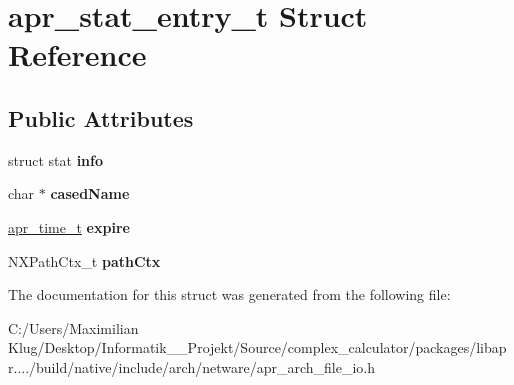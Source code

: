 \hypertarget{structapr__stat__entry__t}{}\section{apr\+\_\+stat\+\_\+entry\+\_\+t Struct Reference}
\label{structapr__stat__entry__t}
\subsection*{Public Attributes}
\begin{DoxyCompactItemize}
\item 
\mbox{\label{structapr__stat__entry__t_aee1501fc3891a4e65d4c8b6130bb928a}} 
struct stat {\bfseries info}
\item 
\mbox{\label{structapr__stat__entry__t_a7b317c0cbf1cda51d11bd7d75cc3f7d9}} 
char $\ast$ {\bfseries cased\+Name}
\item 
\mbox{\label{structapr__stat__entry__t_a8d69f4898156e3ff0e79b61ea7370277}} 
\mbox{\hyperlink{group__apr__time_gadb4bde16055748190eae190c55aa02bb}{apr\+\_\+time\+\_\+t}} {\bfseries expire}
\item 
\mbox{\label{structapr__stat__entry__t_aa494f612975d922420ef7a7eead13e57}} 
N\+X\+Path\+Ctx\+\_\+t {\bfseries path\+Ctx}
\end{DoxyCompactItemize}


The documentation for this struct was generated from the following file\+:\begin{DoxyCompactItemize}
\item 
C\+:/\+Users/\+Maximilian Klug/\+Desktop/\+Informatik\+\_\+\_\+\+Projekt/\+Source/complex\+\_\+calculator/packages/libapr..../build/native/include/arch/netware/apr\+\_\+arch\+\_\+file\+\_\+io.\+h\end{DoxyCompactItemize}
